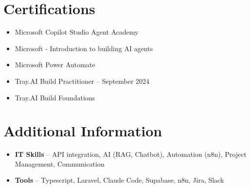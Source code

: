 \documentclass[a4paper,10pt]{article}
\begin{document}
\section{Certifications}
\begin{itemize}
\item Microsoft Copilot Studio Agent Academy
\item Microsoft - Introduction to building AI agents
\item Microsoft Power Automate
\item Tray.AI Build Practitioner -- September 2024
\item Tray.AI Build Foundations
\end{itemize}

\section{Additional Information}
\begin{itemize}
\item \textbf{IT Skills} -- API integration, AI (RAG, Chatbot), Automation (n8n), Project Management, Communication
\item \textbf{Tools} -- Typescript, Laravel, Claude Code, Supabase, n8n, Jira, Slack
\end{itemize}
\end{document}
